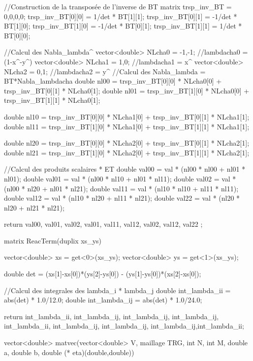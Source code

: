 \begin{codeblock}
{{    //Construction de la transposée de l'inverse de BT
    matrix trsp_inv_BT = {{0,0},{0,0}};
    trsp_inv_BT[0][0] = 1/det * BT[1][1];
    trsp_inv_BT[0][1] = -1/det * BT[1][0];
    trsp_inv_BT[1][0] = -1/det * BT[0][1];
    trsp_inv_BT[1][1] = 1/det * BT[0][0];


    //Calcul des Nabla_lambda^
    vector<double> NLcha0 = {{-1,-1}}; //lambdacha0 = (1-x^-y^)
    vector<double> NLcha1 = {{1,0}}; //lambdacha1 = x^
    vector<double> NLcha2 = {{0,1}}; //lambdacha2 = y^
    //Calcul des Nabla_lambda = BT*Nabla_lambdacha
    double nl00 = trsp_inv_BT[0][0] * NLcha0[0] + trsp_inv_BT[0][1] * NLcha0[1];
    double nl01 = trsp_inv_BT[1][0] * NLcha0[0] + trsp_inv_BT[1][1] * NLcha0[1];

    double nl10 = trsp_inv_BT[0][0] * NLcha1[0] + trsp_inv_BT[0][1] * NLcha1[1];
    double nl11 = trsp_inv_BT[1][0] * NLcha1[0] + trsp_inv_BT[1][1] * NLcha1[1];

    double nl20 = trsp_inv_BT[0][0] * NLcha2[0] + trsp_inv_BT[0][1] * NLcha2[1];
    double nl21 = trsp_inv_BT[1][0] * NLcha2[0] + trsp_inv_BT[1][1] * NLcha2[1];

    //Calcul des produits scalaires * ET
    double val00 = val * (nl00 * nl00 + nl01 * nl01);
    double val01 = val * (nl00 * nl10 + nl01 * nl11);
    double val02 = val * (nl00 * nl20 + nl01 * nl21);
    double val11 = val * (nl10 * nl10 + nl11 * nl11);
    double val12 = val * (nl10 * nl20 + nl11 * nl21);
    double val22 = val * (nl20 * nl20 + nl21 * nl21);

    return {{val00, val01, val02},
        {val01, val11, val12},
        {val02, val12, val22}
    };
}


matrix ReacTerm(duplix xs_ys){
    vector<double> xs = get<0>(xs_ys);
    vector<double> ys = get<1>(xs_ys);

    double det = (xs[1]-xs[0])*(ys[2]-ys[0]) - (ys[1]-ys[0])*(xs[2]-xs[0]);

    //Calcul des integrales des lambda_i * lambda_j
    double int_lambda_ii = abs(det) * 1.0/12.0;
    double int_lambda_ij = abs(det) * 1.0/24.0;

    return {{int_lambda_ii, int_lambda_ij, int_lambda_ij},
        {int_lambda_ij, int_lambda_ii, int_lambda_ij},
        {int_lambda_ij, int_lambda_ij,int_lambda_ii}};
}




vector<double> matvec(vector<double> V, maillage TRG, int N, int M,
    double a, double b, double (* eta)(double,double)){

}}
\end{codeblock}
